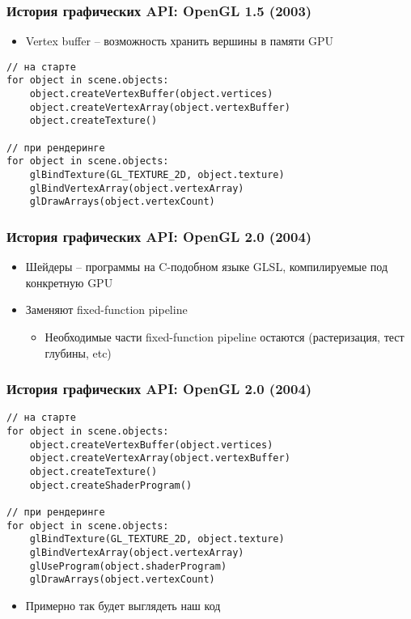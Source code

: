 \documentclass{beamer}
\begin{document}
\begin{frame}[fragile]
\frametitle{История графических API: OpenGL 1.5 (2003)}
\begin{itemize}
\item Vertex buffer -- возможность хранить вершины в памяти GPU
\end{itemize}
\pause
\begin{verbatim}
// на старте
for object in scene.objects:
    object.createVertexBuffer(object.vertices)
    object.createVertexArray(object.vertexBuffer)
    object.createTexture()

// при рендеринге
for object in scene.objects:
    glBindTexture(GL_TEXTURE_2D, object.texture)
    glBindVertexArray(object.vertexArray)
    glDrawArrays(object.vertexCount)
\end{verbatim}
\end{frame}

\begin{frame}
\frametitle{История графических API: OpenGL 2.0 (2004)}
\begin{itemize}
\item Шейдеры -- программы на C-подобном языке GLSL, компилируемые под конкретную GPU
\item Заменяют fixed-function pipeline
\begin{itemize}
\item Необходимые части fixed-function pipeline остаются (растеризация, тест глубины, etc)
\end{itemize}
\end{itemize}
\end{frame}

\begin{frame}[fragile]
\frametitle{История графических API: OpenGL 2.0 (2004)}
\begin{verbatim}
// на старте
for object in scene.objects:
    object.createVertexBuffer(object.vertices)
    object.createVertexArray(object.vertexBuffer)
    object.createTexture()
    object.createShaderProgram()

// при рендеринге
for object in scene.objects:
    glBindTexture(GL_TEXTURE_2D, object.texture)
    glBindVertexArray(object.vertexArray)
    glUseProgram(object.shaderProgram)
    glDrawArrays(object.vertexCount)
\end{verbatim}
\pause
\begin{itemize}
\item Примерно так будет выглядеть наш код
\end{itemize}
\end{frame}
\end{document}
